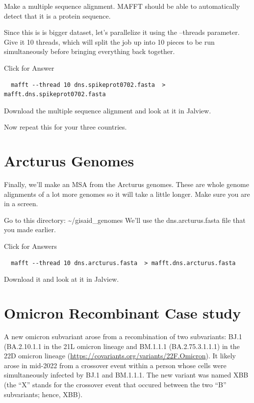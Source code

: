 \documentclass[
]{book}
\begin{document}
\hfill\break

Make a multiple sequence alignment. MAFFT should be able to automatically detect that it is a protein sequence.

Since this is is bigger dataset, let's parallelize it using the --threads parameter. Give it 10 threads, which will split the job up into 10 pieces to be run simultaneously before bringing everything back together.

Click for Answer

\begin{verbatim}
  mafft --thread 10 dns.spikeprot0702.fasta  > mafft.dns.spikeprot0702.fasta
\end{verbatim}

\hfill\break

Download the multiple sequence alignment and look at it in Jalview.

Now repeat this for your three countries.

\hypertarget{arcturus-genomes}{%
\section{Arcturus Genomes}\label{arcturus-genomes}}

Finally, we'll make an MSA from the Arcturus genomes. These are whole genome alignments of a lot more genomes so it will take a little longer. Make sure you are in a screen.

Go to this directory: \textasciitilde/gisaid\_genomes
We'll use the dns.arcturus.fasta file that you made earlier.

Click for Answers

\begin{verbatim}
  mafft --thread 10 dns.arcturus.fasta  > mafft.dns.arcturus.fasta
\end{verbatim}

\hfill\break

Download it and look at it in Jalview.

\hypertarget{omicron-recombinant-case-study}{%
\section{Omicron Recombinant Case study}\label{omicron-recombinant-case-study}}

A new omicron subvariant arose from a recombination of two subvariants: BJ.1 (BA.2.10.1.1 in the 21L omicron lineage and BM.1.1.1 (BA.2.75.3.1.1.1) in the 22D omicron lineage (\url{https://covariants.org/variants/22F.Omicron}). It likely arose in mid-2022 from a crossover event within a person whose cells were simultaneously infected by BJ.1 and BM.1.1.1. The new variant was named XBB (the ``X'' stands for the crossover event that occured between the two ``B'' subvariants; hence, XBB).
\end{document}
